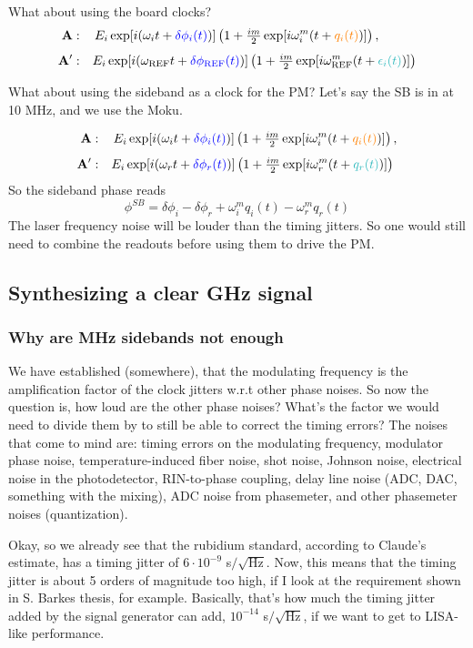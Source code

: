 \documentclass[11pt]{article}
\begin{document}
What about using the board clocks?
\begin{align*}
\mathbf{A}:&\quad\,E_{i}\exp[i(\omega_{i} t + {\color{blue}\delta\phi_{i}(t)})]
  \left(1 + \tfrac{im}{2}\exp[i\omega_{i}^m (t + {\color{orange}q_{i}(t)})]\right),\\[4pt]
\mathbf{A'}:&\quad
 E_{i}\exp[i(\omega_{\text{REF}}t + {\color{blue}\delta\phi_{\text{REF}
 }(t)})] \left(1 + \tfrac{im}{2}\exp[i\omega_{\text{REF}}^m (t + {\color{Aquamarine}\epsilon_{i}(t)})]\right)
\end{align*}

What about using the sideband as a clock for the PM? Let's say the SB is in at 10 MHz, and we use the Moku.

\begin{align*}
\mathbf{A}:&\quad\,E_{i}\exp[i(\omega_{i} t + {\color{blue}\delta\phi_{i}(t)})]
  \left(1 + \tfrac{im}{2}\exp[i\omega_{i}^m (t + {\color{orange}q_{i}(t)})]\right),\\[4pt]
\mathbf{A'}:&\quad
 E_{i}\exp[i(\omega_{r}t + {\color{blue}\delta\phi_{r
 }(t)})] \left(1 + \tfrac{im}{2}\exp[i\omega_{r}^m (t + {\color{Aquamarine}q_{r}(t)})]\right)
\end{align*}
So the sideband phase reads
\begin{equation*}
    \phi^{SB}=\delta\phi_i-\delta \phi_r+\omega^m_iq_i(t)-\omega^m_rq_r(t)
\end{equation*}
The laser frequency noise will be louder than the timing jitters. So one would still need to combine the readouts before using them to drive the PM. 

\subsection*{Synthesizing a clear GHz signal}
\subsubsection*{Why are MHz sidebands not enough}
We have established (somewhere), that the modulating frequency is the amplification factor of the clock jitters w.r.t other phase noises. So now the question is, how loud are the other phase noises? What's the factor we would need to divide them by to still be able to correct the timing errors? The noises that come to mind are: timing errors on the modulating frequency, modulator phase noise, temperature-induced fiber noise, shot noise, Johnson noise, electrical noise in the photodetector, RIN-to-phase coupling, delay line noise (ADC, DAC, something with the mixing), ADC noise from phasemeter, and other phasemeter noises (quantization).


Okay, so we already see that the rubidium standard, according to Claude's estimate, has a timing jitter of $6 \cdot 10^{-9}$ s$/\sqrt{\text{Hz}}$. Now, this means that the timing jitter is about 5 orders of magnitude too high, if I look at the requirement shown in S. Barkes thesis, for example. Basically, that's how much the timing jitter added by the signal generator can add, $10^{-14}$ s$/\sqrt{\text{Hz}}$, if we want to get to LISA-like performance.
\end{document}
